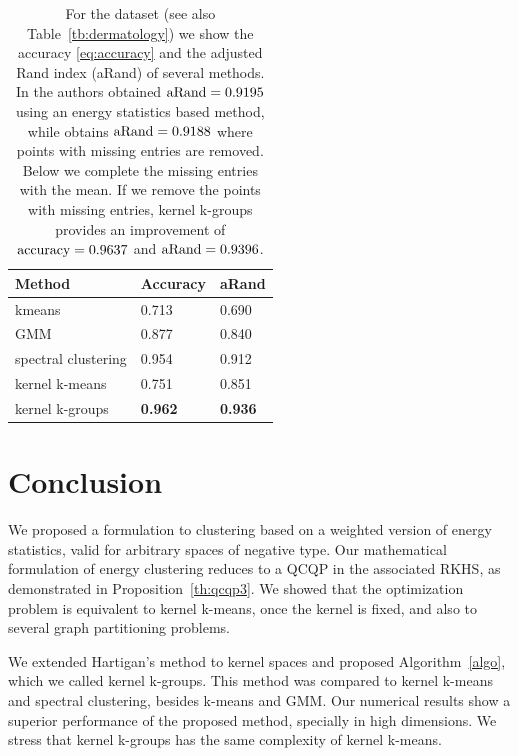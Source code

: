 \documentclass[10pt,journal,compsoc]{IEEEtran}
\begin{document}
\begin{table}
\caption{
\label{tb:dermatology_accuracy}
For the dataset \cite{Dua2017,Guvenir1998} (see also
Table~\ref{tb:dermatology}) we show the accuracy \eqref{eq:accuracy} and
the adjusted Rand index (aRand) of several methods.
In \cite{RizzoClustering} the authors 
obtained $\textnormal{aRand}=0.9195$ using an energy statistics
based method, while \cite{Kgroups} obtains $\textnormal{aRand}=0.9188$ 
where points with missing
entries are removed. Below we complete the missing entries with the mean.
If we remove the points with missing entries, kernel k-groups provides an
improvement of $\textnormal{accuracy}=0.9637$ and $\textnormal{aRand}=0.9396$.
}
\centering
\begin{tabular}{@{}l|ll@{}}
       Method      & Accuracy & aRand \\ \midrule[.5pt]
        kmeans       & 0.713 & 0.690 \\
         GMM         & 0.877 & 0.840 \\
 spectral clustering & 0.954 & 0.912 \\
    kernel k-means   & 0.751 & 0.851 \\
   kernel k-groups   & \textbf{0.962} & \textbf{0.936}
\end{tabular}
\end{table}


\section{Conclusion}
\label{sec:conclusion}

We proposed a formulation to clustering based on a weighted
version of energy statistics, 
valid for arbitrary spaces of negative type.
Our mathematical formulation of energy clustering 
reduces to a QCQP in the associated RKHS, as demonstrated in 
Proposition~\ref{th:qcqp3}.
We showed that the optimization problem
is equivalent
to kernel k-means, once the kernel is fixed, and also
to several graph partitioning problems.

We extended Hartigan's method to kernel spaces and proposed
Algorithm~\ref{algo}, which we called kernel k-groups.
This method was compared to kernel k-means and spectral clustering, besides
k-means and GMM. Our numerical results show a superior performance of the
proposed method, specially in high dimensions.
We stress that kernel k-groups has the same complexity of kernel k-means.
\end{document}
